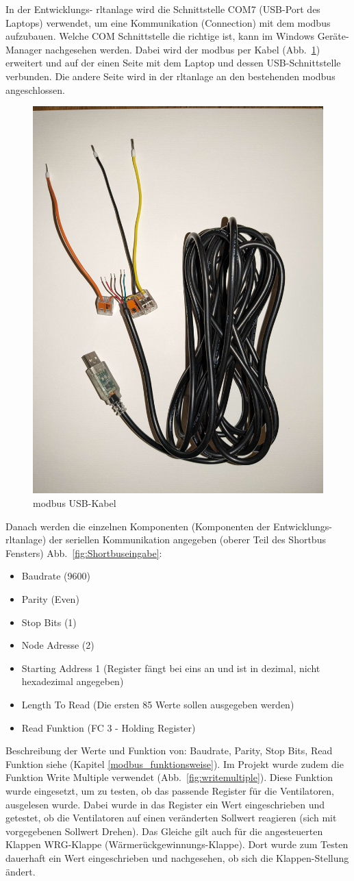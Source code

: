 In der Entwicklungs- \ac{rltanlage} wird die Schnittstelle COM7 (USB-Port des Laptops) verwendet, um eine Kommunikation (Connection) mit dem \gls{modbus} aufzubauen. Welche COM Schnittstelle die richtige ist, kann im Windows Geräte-Manager nachgesehen werden. Dabei wird der \gls{modbus} per Kabel  (Abb.~\ref{fig:modbus_usbkabel}) erweitert und auf der einen Seite mit dem Laptop und dessen USB-Schnittstelle verbunden. Die andere Seite wird in der \ac{rltanlage} an den bestehenden \gls{modbus} angeschlossen. 

\begin{figure}[H]
	\centering
	\includegraphics[width=0.3\linewidth]{Bilder/modbus_usbkabel}
	\caption{\gls{modbus} USB-Kabel} 
	\label{fig:modbus_usbkabel}
\end{figure}

Danach werden die einzelnen Komponenten (Komponenten der Entwicklungs- \ac{rltanlage}) der seriellen Kommunikation angegeben (oberer Teil des Shortbus Fensters) Abb.~\ref{fig:Shortbuseingabe}:
\begin{itemize}
	\item Baudrate (9600)
	\item Parity (Even)
	\item Stop Bits (1)
	\item Node Adresse (2)
	\item Starting Address 1 (Register fängt bei eins an und ist in dezimal, nicht hexadezimal angegeben)
	\item Length To Read (Die ersten 85 Werte sollen ausgegeben werden)
	\item Read Funktion (FC 3 - Holding Register)
\end{itemize}

Beschreibung der Werte und Funktion von: Baudrate, Parity, Stop Bits, Read Funktion siehe (Kapitel \ref{modbus_funktionsweise}).
Im Projekt wurde zudem die Funktion Write Multiple verwendet (Abb.~\ref{fig:writemultiple}). Diese Funktion wurde eingesetzt, um zu testen, ob das passende Register für \zB die Ventilatoren, ausgelesen wurde. Dabei wurde in das Register ein Wert eingeschrieben und getestet, ob die Ventilatoren auf einen veränderten Sollwert reagieren (sich mit vorgegebenen Sollwert Drehen). Das Gleiche gilt auch für die angesteuerten Klappen \zB WRG-Klappe (Wärmerückgewinnungs-Klappe). Dort wurde zum Testen dauerhaft ein Wert eingeschrieben und nachgesehen, ob sich die Klappen-Stellung ändert.

